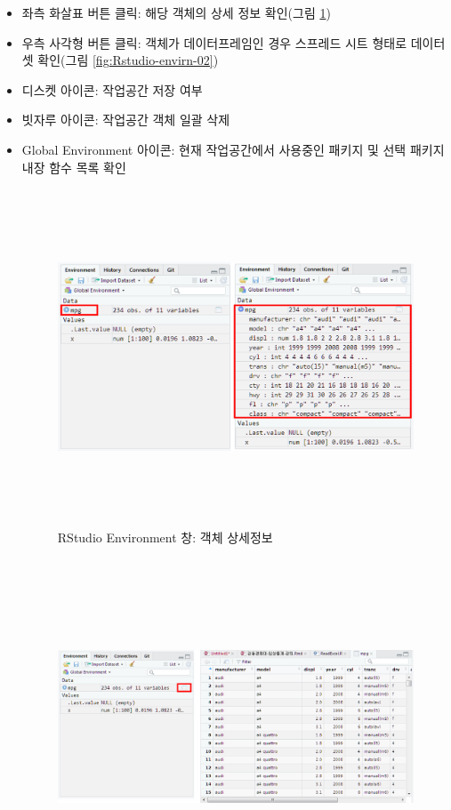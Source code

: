 \documentclass[11pt,a4paper]{book}
\providecommand{\tightlist}{%
  \setlength{\itemsep}{0pt}\setlength{\parskip}{0pt}}
\theoremstyle{definition}
\theoremstyle{definition}
\theoremstyle{definition}
\theoremstyle{remark}
\begin{document}
\begin{enumerate}
\begin{enumerate}
    \begin{itemize}
    \tightlist
    \item
      좌측 화살표 버튼 클릭: 해당 객체의 상세 정보 확인(그림
      \ref{fig:Rstudio-envirn-01})
    \item
      우측 사각형 버튼 클릭: 객체가 데이터프레임인 경우 스프레드 시트
      형태로 데이터셋 확인(그림 \ref{fig:Rstudio-envirn-02})
    \item
      디스켓 아이콘: 작업공간 저장 여부
    \item
      빗자루 아이콘: 작업공간 객체 일괄 삭제
    \item
      Global Environment 아이콘: 현재 작업공간에서 사용중인 패키지 및
      선택 패키지 내장 함수 목록 확인

      \begin{figure}[H] {
        \centering
        \includegraphics[width = 12cm, height = 10cm]{Figures/Rstudio-envwin-01.png}
        \caption[RStudio Environment 창: 객체 상세정보]{RStudio Environment 창: 객체 상세정보}\label{fig:Rstudio-envirn-01}
      } \end{figure}\begin{figure}[H] {
        \centering
        \includegraphics[width = 15cm, height = 10cm]{Figures/Rstudio-envwin-02.png}
}
\end{figure}
\end{itemize}
\end{enumerate}
\end{enumerate}
\end{document}
